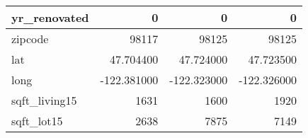 \begin{table}[H]
\begin{tabular}{|l|r|r|r|}
\hline yr\_renovated & \cellcolor[rgb]{0.9, 0.54, 0.52} 0 & \cellcolor[rgb]{0.9, 0.54, 0.52} 0 & \cellcolor[rgb]{0.9, 0.54, 0.52} 0 \\
\hline zipcode & \cellcolor[rgb]{0.9, 0.54, 0.52} 98117 & 98125 & 98125 \\
\hline lat & \cellcolor[rgb]{0.9, 0.54, 0.52} 47.704400 & 47.724000 & 47.723500 \\
\hline long & \cellcolor[rgb]{0.9, 0.54, 0.52} -122.381000 & \cellcolor[rgb]{0.9, 0.54, 0.52} -122.323000 & \cellcolor[rgb]{0.9, 0.54, 0.52} -122.326000 \\
\hline sqft\_living15 & \cellcolor[rgb]{0.9, 0.54, 0.52} 1631 & 1600 & 1920 \\
\hline sqft\_lot15 & \cellcolor[rgb]{0.9, 0.54, 0.52} 2638 & 7875 & 7149 \\
\hline
\end{tabular}
\end{table}
